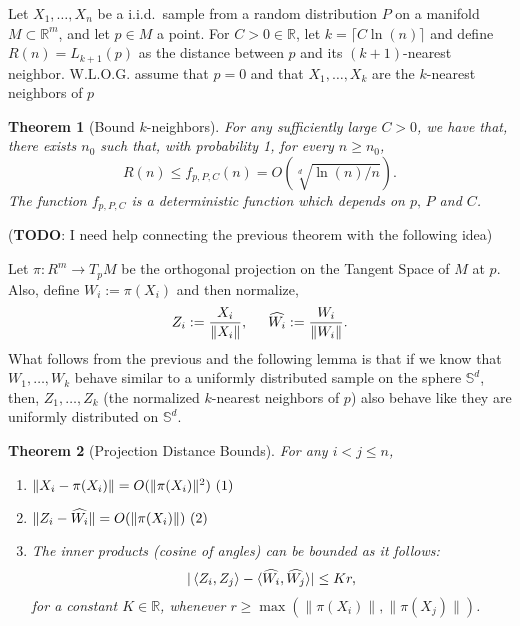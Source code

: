 \documentclass[12pt]{exam}
\newcommand\inlinetag{\stepcounter{equation}\ (\theequation)}
\def\R{\ensuremath{\mathbb{R}}}
\def\S{\ensuremath{\mathbb{S}}}
\newtheorem{theorem}{Theorem}[section]
\theoremstyle{remark}
\newcommand{\angles}[1]{\ensuremath{\left\langle}#1\ensuremath{\right\rangle} }
\begin{document}
Let $X_1,\ldots, X_n$ be a i.i.d.\ sample from a random distribution $P$ on a manifold $M \subset \R^m$, and let $p \in M$ a point. For $C>0 \in  \R$, let $k = \lceil C \ln(n)\rceil$ and define $R(n) = L_{k+1}(p)$ as the distance between $p$ and its $(k+1)$-nearest neighbor. W.L.O.G. assume that $p = 0$ and that $X_1,\ldots, X_k$ are the $k$-nearest neighbors of $p$

\begin{theorem}[Bound $k$-neighbors]\label{ade:T2}
  For any sufficiently large $C > 0$, we have that, there exists $n_0$ such that, with probability 1, for every $n \geq n_0$,
  \begin{equation}\label{ade:3}
    R(n) \leq f_{p,P,C}(n) = O(\sqrt[d]{\ln(n)/n}).
  \end{equation}
  The function $f_{p,P,C}$ is a deterministic function which depends on $p,\, P$ and $C$.
\end{theorem}

(\textbf{TODO}: I need help connecting the previous theorem with the following idea)

Let $\pi : R^m \to T_p M$ be the orthogonal projection on the Tangent Space of $M$ at $p$. Also, define $W_i := \pi(X_i)$ and then normalize,
\[ Z_i := \frac{X_i}{\|X_i\|},\hspace*{5mm} \widehat{W_i} := \frac{W_i}{\|W_i\|}. \] 
What follows from the previous and the following lemma is that if we know that $W_1,\ldots, W_k$ behave similar to a uniformly distributed sample on the sphere $\S^d$, then, $Z_1,\ldots, Z_k$ (the normalized $k$-nearest neighbors of $p$) also behave like they are uniformly distributed on $\S^d$.

\begin{theorem}[Projection Distance Bounds]\label{ade:T3}
  For any $i<j \leq n$,
  \begin{enumerate}
    \item[(i)]    \( \|X_i-\pi(X_i)\|  =   O(\|\pi (X_i)\|^2) \hfill\inlinetag  \)
    \item[(ii)]   \( \|Z_i-\widehat{W_i}\|  =   O(\|\pi (X_i) \|) \hfill\inlinetag \)
    \item[(iii)]  The inner products (cosine of angles) can be bounded as it follows:
    \begin{equation}\label{ade:6}
      |\angles{Z_i,Z_j} - \langle\widehat{W_i}, \widehat{W_j}\rangle| \leq K r,
    \end{equation}
    for a constant $K\in\R$, whenever $r \geq \max (\|\pi(X_i)\|,\|\pi(X_j)\|)$.
  \end{enumerate}
\end{theorem}
\end{document}
